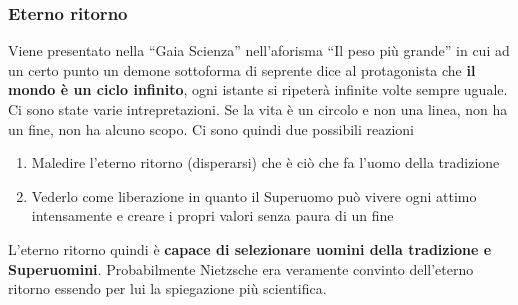 \subsubsection{Eterno ritorno}
Viene presentato nella ``Gaia Scienza'' nell'aforisma ``Il peso più grande'' in cui ad un certo punto
un demone sottoforma di seprente dice al protagonista che \textbf{il mondo è un ciclo infinito}, 
ogni istante si ripeterà infinite volte sempre uguale. Ci sono state varie intrepretazioni. Se la 
vita è un circolo e non una linea, non ha un fine, non ha alcuno scopo. Ci sono quindi due possibili 
reazioni
\begin{enumerate}
  \item Maledire l'eterno ritorno (disperarsi) che è ciò che fa l'uomo della tradizione
  \item Vederlo come liberazione in quanto il Superuomo può vivere ogni attimo intensamente e creare
    i propri valori senza paura di un fine
\end{enumerate}
L'eterno ritorno quindi è \textbf{capace di selezionare uomini della tradizione e Superuomini}.
Probabilmente Nietzsche era veramente convinto dell'eterno ritorno essendo per lui la spiegazione
più scientifica.

